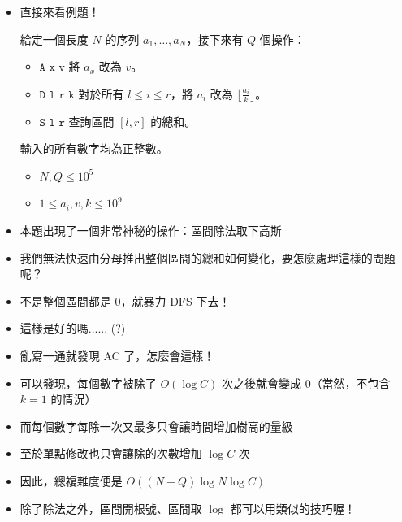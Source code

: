 \documentclass[standalone]{beamer}
\begin{document}
\begin{frame}[fragile]{}
  \begin{itemize}
    \item 直接來看例題！
    \begin{problem}
      給定一個長度 $N$ 的序列 $a_1,\dots,a_N$，接下來有 $Q$ 個操作：
      \begin{itemize}
          \item \(\texttt{A x v}\) 將 $a_x$ 改為 $v$。
          \item \(\texttt{D l r k}\) 對於所有 $l\leq i\leq r$，將 $a_i$ 改為 $\lfloor \frac{a_i}{k} \rfloor$。
          \item \(\texttt{S l r}\) 查詢區間 $[l, r]$ 的總和。
      \end{itemize}
      輸入的所有數字均為正整數。

      \begin{itemize}
          \item
              $N, Q \leq 10^5$
          \item
              $1 \leq a_i, v, k \leq 10^9$
      \end{itemize}
    \end{problem}
  \end{itemize}
\end{frame}

\begin{frame}[fragile]{}
  \begin{itemize}
    \item 本題出現了一個非常神秘的操作：區間除法取下高斯
    \item 我們無法快速由分母推出整個區間的總和如何變化，要怎麼處理這樣的問題呢？
    \item 不是整個區間都是 $0$，就暴力 DFS 下去！
    \item 這樣是好的嗎...... (?)
    \item 亂寫一通就發現 AC 了，怎麼會這樣！
  \end{itemize}
\end{frame}

\begin{frame}[fragile]{}
  \begin{itemize}
    \item 可以發現，每個數字被除了 $O(\log C)$ 次之後就會變成 $0$（當然，不包含 $k=1$ 的情況）
    \item 而每個數字每除一次又最多只會讓時間增加樹高的量級
    \item 至於單點修改也只會讓除的次數增加 $\log C$ 次
    \item 因此，總複雜度便是 $O((N+Q)\log N \log C)$
    \item 除了除法之外，區間開根號、區間取 $\log$ 都可以用類似的技巧喔！
  \end{itemize}
\end{frame}
\end{document}

